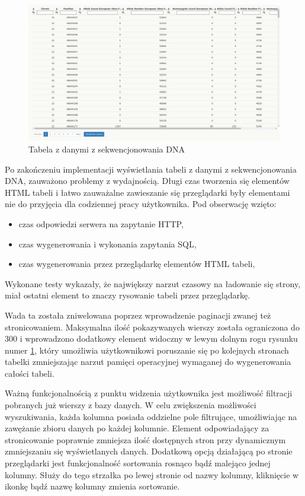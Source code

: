 \documentclass[a4paper,12pt,twoside]{article}
\begin{document}
\begin{figure}[h!]
  \includegraphics[width=\linewidth]{obrazy/aplikacja/table1.png}
  \caption{Tabela z danymi z sekwencjonowania DNA}
  \label{fig:table1pic}
\end{figure}

Po zakończeniu implementacji wyświetlania tabeli z danymi z sekwencjonowania DNA,
zauważono problemy z wydajnością.
Długi czas tworzenia się elementów HTML tabeli i łatwo zauważalne zawieszanie się przeglądarki
były elementami nie do przyjęcia dla codziennej pracy użytkownika.
Pod obserwację wzięto:
\begin{itemize}
\item czas odpowiedzi serwera na zapytanie HTTP,
\item czas wygenerowania i wykonania zapytania SQL,
\item czas wygenerowania przez przeglądarkę elementów HTML tabeli,
\end{itemize} 
Wykonane testy wykazały, że największy narzut czasowy na ładowanie się strony, miał ostatni 
element to znaczy rysowanie tabeli przez przeglądarkę. 

Wada ta została zniwelowana poprzez wprowadzenie paginacji zwanej też stronicowaniem.
Maksymalna ilość pokazywanych wierszy została ograniczona do 300 i wprowadzono dodatkowy 
element widoczny w lewym dolnym rogu rysunku numer \ref{fig:table1pic}, który umożliwia 
użytkownikowi poruszanie się po kolejnych stronach tabelki zmniejszając narzut 
pamięci operacyjnej wymaganej do wygenerowania całości tabeli.  
\newline

Ważną funkcjonalnością z punktu widzenia użytkownika jest możliwość filtracji pobranych już wierszy
z bazy danych. W celu zwiększenia możliwości wyszukiwania, każda kolumna posiada oddzielne pole 
filtrujące, umożliwiając na zawężanie zbioru danych po każdej kolumnie. Element odpowiadający
za stronicowanie poprawnie zmniejsza ilość dostępnych stron przy dynamicznym zmniejszaniu się
wyświetlanych danych.
Dodatkową opcją działającą po stronie przeglądarki jest 
funkcjonalność sortowania rosnąco bądź malejąco jednej kolumny. Służy do tego strzałka po
lewej stronie od nazwy kolumny, kliknięcie w ikonkę bądź nazwę kolumny zmienia sortowanie.
\end{document}
